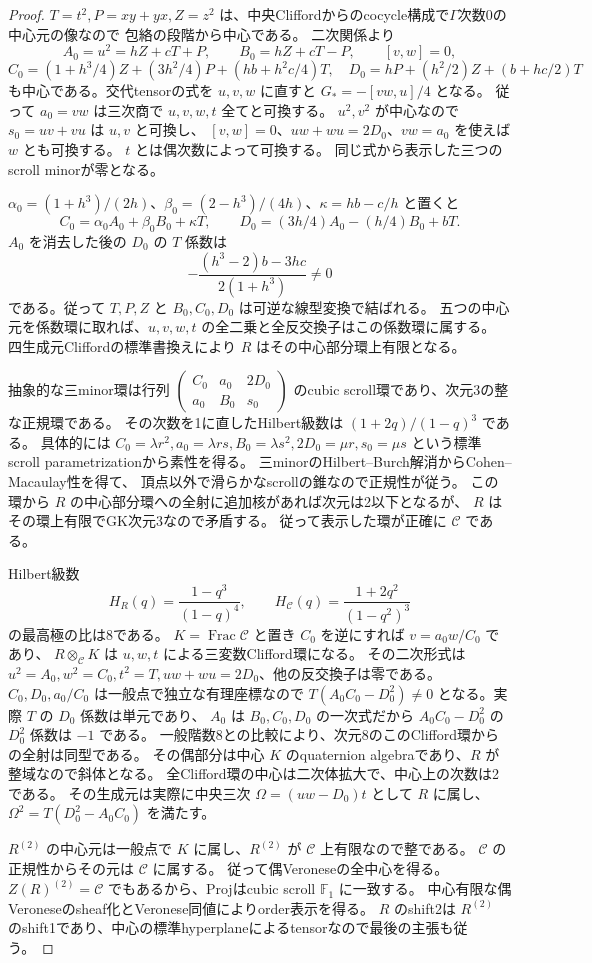 \begin{proof}
$T=t^2,P=xy+yx,Z=z^2$ は、中央Cliffordからのcocycle構成で$\Gamma$次数0の中心元の像なので
包絡の段階から中心である。
二次関係より
\[
 A_0=u^2=hZ+cT+P,\qquad B_0=hZ+cT-P,\qquad [v,w]=0,
\]
\[
 C_0=(1+h^3/4)Z+(3h^2/4)P+(hb+h^2c/4)T,
 \quad D_0=hP+(h^2/2)Z+(b+hc/2)T
\]
も中心である。交代tensorの式を $u,v,w$ に直すと
$G_*=-[vw,u]/4$ となる。
従って $a_0=vw$ は三次商で $u,v,w,t$ 全てと可換する。
$u^2,v^2$ が中心なので $s_0=uv+vu$ は $u,v$ と可換し、
$[v,w]=0$、$uw+wu=2D_0$、$vw=a_0$ を使えば $w$ とも可換する。
$t$ とは偶次数によって可換する。
同じ式から表示した三つのscroll minorが零となる。

$\alpha_0=(1+h^3)/(2h)$、$\beta_0=(2-h^3)/(4h)$、$\kappa=hb-c/h$ と置くと
\[
 C_0=\alpha_0A_0+\beta_0B_0+\kappa T,\qquad
 D_0=(3h/4)A_0-(h/4)B_0+bT.
\]
$A_0$ を消去した後の $D_0$ の $T$ 係数は
\[
 -\frac{(h^3-2)b-3hc}{2(1+h^3)}\ne0
\]
である。従って $T,P,Z$ と $B_0,C_0,D_0$ は可逆な線型変換で結ばれる。
五つの中心元を係数環に取れば、$u,v,w,t$ の全二乗と全反交換子はこの係数環に属する。
四生成元Cliffordの標準書換えにより $R$ はその中心部分環上有限となる。

抽象的な三minor環は行列
$\left(\begin{smallmatrix}C_0&a_0&2D_0\\a_0&B_0&s_0\end{smallmatrix}\right)$
のcubic scroll環であり、次元3の整な正規環である。
その次数を1に直したHilbert級数は $(1+2q)/(1-q)^3$ である。
具体的には
$C_0=\lambda r^2,a_0=\lambda rs,B_0=\lambda s^2,2D_0=\mu r,s_0=\mu s$
という標準scroll parametrizationから素性を得る。
三minorのHilbert--Burch解消からCohen--Macaulay性を得て、
頂点以外で滑らかなscrollの錐なので正規性が従う。
この環から $R$ の中心部分環への全射に追加核があれば次元は2以下となるが、
$R$ はその環上有限でGK次元3なので矛盾する。
従って表示した環が正確に $\mathcal C$ である。

Hilbert級数
\[
 H_R(q)=\frac{1-q^3}{(1-q)^4},\qquad
 H_{\mathcal C}(q)=\frac{1+2q^2}{(1-q^2)^3}
\]
の最高極の比は8である。
$K=\operatorname{Frac}\mathcal C$ と置き $C_0$ を逆にすれば $v=a_0w/C_0$ であり、
$R\otimes_{\mathcal C}K$ は $u,w,t$ による三変数Clifford環になる。
その二次形式は $u^2=A_0,w^2=C_0,t^2=T,uw+wu=2D_0$、他の反交換子は零である。
$C_0,D_0,a_0/C_0$ は一般点で独立な有理座標なので
$T(A_0C_0-D_0^2)\ne0$ となる。実際 $T$ の $D_0$ 係数は単元であり、
$A_0$ は $B_0,C_0,D_0$ の一次式だから $A_0C_0-D_0^2$ の $D_0^2$ 係数は $-1$ である。
一般階数8との比較により、次元8のこのClifford環からの全射は同型である。
その偶部分は中心 $K$ のquaternion algebraであり、$R$ が整域なので斜体となる。
全Clifford環の中心は二次体拡大で、中心上の次数は2である。
その生成元は実際に中央三次 $\Omega=(uw-D_0)t$ として $R$ に属し、
$\Omega^2=T(D_0^2-A_0C_0)$ を満たす。

$R^{(2)}$ の中心元は一般点で $K$ に属し、$R^{(2)}$ が $\mathcal C$ 上有限なので整である。
$\mathcal C$ の正規性からその元は $\mathcal C$ に属する。
従って偶Veroneseの全中心を得る。
$Z(R)^{(2)}=\mathcal C$ でもあるから、Projはcubic scroll $\mathbb F_1$ に一致する。
中心有限な偶Veroneseのsheaf化とVeronese同値によりorder表示を得る。
$R$ のshift2は $R^{(2)}$ のshift1であり、中心の標準hyperplaneによるtensorなので最後の主張も従う。
\end{proof}

